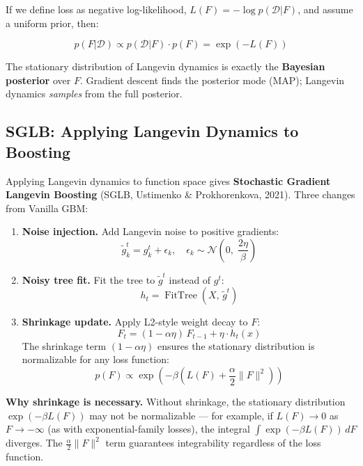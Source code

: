 \documentclass[11pt, a4paper]{article}
\begin{document}
If we define loss as negative log-likelihood,
$L(F) = -\log p(\mathcal{D}|F)$, and assume a uniform prior, then:

\[
p(F|\mathcal{D}) \propto p(\mathcal{D}|F) \cdot p(F) = \exp(-L(F))
\]

The stationary distribution of Langevin dynamics is exactly the
\textbf{Bayesian posterior} over $F$.
Gradient descent finds the posterior mode (MAP);
Langevin dynamics \emph{samples} from the full posterior.

\subsection{SGLB: Applying Langevin Dynamics to Boosting}

Applying Langevin dynamics to function space gives
\textbf{Stochastic Gradient Langevin Boosting} (SGLB,
Ustimenko \& Prokhorenkova, 2021).
Three changes from Vanilla GBM:

\begin{enumerate}
  \item \textbf{Noise injection.} Add Langevin noise to positive gradients:
    \[
      \tilde{g}_k^t = g_k^t + \epsilon_k, \quad
      \epsilon_k \sim \mathcal{N}\!\left(0,\;\frac{2\eta}{\beta}\right)
    \]

  \item \textbf{Noisy tree fit.} Fit the tree to $\tilde{g}^t$ instead of $g^t$:
    \[
      h_t = \operatorname{FitTree}(X,\, \tilde{g}^t)
    \]

  \item \textbf{Shrinkage update.} Apply L2-style weight decay to $F$:
    \[
      F_t = (1 - \alpha\eta)\,F_{t-1} + \eta\cdot h_t(x)
    \]
    The shrinkage term $(1-\alpha\eta)$ ensures the stationary distribution
    is normalizable for any loss function:
    \[
      p(F) \propto \exp\!\left(-\beta\left(L(F) + \frac{\alpha}{2}\|F\|^2\right)\right)
    \]
\end{enumerate}

\textbf{Why shrinkage is necessary.}
Without shrinkage, the stationary distribution $\exp(-\beta L(F))$
may not be normalizable --- for example, if $L(F) \to 0$ as
$F \to -\infty$ (as with exponential-family losses), the integral
$\int \exp(-\beta L(F))\,dF$ diverges.
The $\frac{\alpha}{2}\|F\|^2$ term guarantees integrability
regardless of the loss function.
\end{document}
